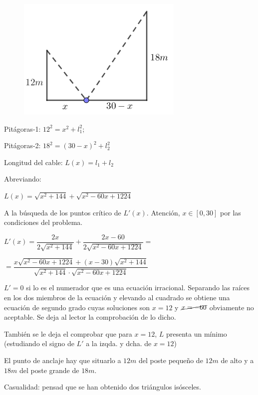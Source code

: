 	\begin{proofw}\renewcommand{\qedsymbol}{$\diamond$}
	
	
	\begin{multicols}{2}
	
	\begin{figure}[H]
	\centering
	\includegraphics[width=.35\textwidth]{imagenes/imagenes05/T05IM19.png}
	\end{figure}
	
	\hspace{6mm}Pitágoras-1: $12^2=x^2+l_1^2$; 
	
	Pitágoras-2: $18^2=(30-x)^2+l_2^2$
	
	Longitud del cable: $L(x)=l_1+l_2$
	
	Abreviando: 
	
	$L(x)= \sqrt{x^2+144}+ \sqrt{x^2-60x+1224}$
		
	\end{multicols}
	
	A la búsqueda de los puntos crítico de $L'(x)$. Atención, $x\in [0,30]$ por las condiciones del problema.
	
	$L'(x)= \dfrac {2x}{2\sqrt{x^2+144}} + \dfrac {2x-60}{2\sqrt{x^2-60x+1224}}= $
	
	$=\dfrac {x\sqrt{x^2-60x+1224}+(x-30)\sqrt{x^2+144}}{\sqrt{x^2+144} \cdot \sqrt{x^2-60x+1224}}$
	
	$L'=0$ si lo es el numerador que es una ecuación irracional. Separando las raíces en los dos miembros de la ecuación y elevando al cuadrado se obtiene una ecuación de segundo grado cuyas soluciones son $x=12$ y $\cancel{x=-60}$ obviamente no aceptable.  Se deja al lector la comprobación de lo dicho.
	
	También se le deja el comprobar que para $x=12$, $L$ presenta un mínimo (estudiando el signo de $L'$ a la izqda. y dcha. de $x=12$)
	
	El punto de anclaje hay que situarlo a $12m$ del poste pequeño de $12m$ de alto y a $18m$ del poste grande de $18m$.
	
	\textcolor{gris}{Casualidad: pensad que se han obtenido dos triángulos isósceles.}
	
	\end{proofw}


